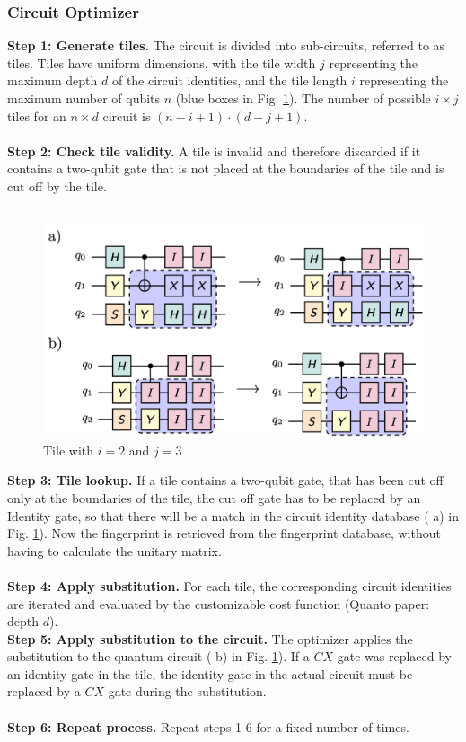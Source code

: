 \subsubsection{Circuit Optimizer}
\textbf{Step 1: Generate tiles.}
The circuit is divided into sub-circuits, referred to as tiles. Tiles have uniform dimensions, with the tile width $j$ representing the maximum depth $d$ of the circuit identities, and the tile length $i$ representing the maximum number of qubits $n$ (blue boxes in Fig. \ref{fig:quanto_tile}). The number of possible $i \times j$ tiles for an $n \times d$ circuit is $(n-i+1) \cdot (d-j+1)$.
\\\\
\textbf{Step 2: Check tile validity.}
A tile is invalid and therefore discarded if it contains a two-qubit gate that is not placed at the boundaries of the tile and is cut off by the tile.
\\\\
\begin{figure}
  \includegraphics[width=1\columnwidth]{assets/quanto_tile2.png}
  \caption{Tile with $i=2$ and $j=3$}
  \label{fig:quanto_tile}
\end{figure}
\textbf{Step 3: Tile lookup.}
If a tile contains a two-qubit gate, that has been cut off only at the boundaries of the tile, the cut off gate has to be replaced by an Identity gate, so that there will be a match in the circuit identity database ( a) in Fig. \ref{fig:quanto_tile}). Now the fingerprint is retrieved from the fingerprint database, without having to calculate the unitary matrix. 
\\\\
\textbf{Step 4: Apply substitution.}
For each tile, the corresponding circuit identities are iterated and evaluated by the customizable cost function (Quanto paper: depth $d$).
\\
\textbf{Step 5: Apply substitution to the circuit.}
The optimizer applies the substitution to the quantum circuit ( b) in Fig. \ref{fig:quanto_tile}). If a $CX$ gate was replaced by an identity gate in the tile, the identity gate in the actual circuit must be replaced by a $CX$ gate during the substitution. 
\\\\
\textbf{Step 6: Repeat process.}
Repeat steps 1-6 for a fixed number of times.

